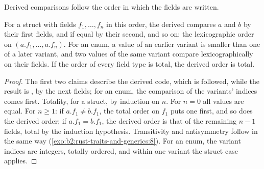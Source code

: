 \begin{omfigure}
\par{}
\end{omfigure}

Derived comparisons follow the order in which the fields are written.

\begin{proposition}\label{prop:b2:rust-traits-and-generics:derived-ord}
For a struct with fields $f_1, \dots, f_n$ in this order, the derived  compares $a$ and $b$ by their first
fields, and if equal by their second, and so on: the lexicographic order on $(a.f_1, \dots, a.f_n)$. For an enum, a
value of an earlier variant is smaller than one of a later variant, and two values of the same variant compare
lexicographically on their fields. If the order of every field type is total, the derived order is total.
\end{proposition}

\begin{proof}
The first two claims describe the derived code, which is  followed, while the result is
, by the next fields; for an enum, the comparison of the variants' indices comes first. Totality, for a
struct, by induction on $n$. For $n = 0$ all values are equal. For $n \ge 1$: if $a.f_1 \ne b.f_1$, the total order
on $f_1$ puts one first, and so does the derived order; if $a.f_1 = b.f_1$, the derived order is that of the
remaining $n - 1$ fields, total by the induction hypothesis. Transitivity and antisymmetry follow in the same way
(\cref{exo:b2:rust-traits-and-generics:8}). For an enum, the variant indices are integers, totally ordered, and within
one variant the struct case applies.
\end{proof}

